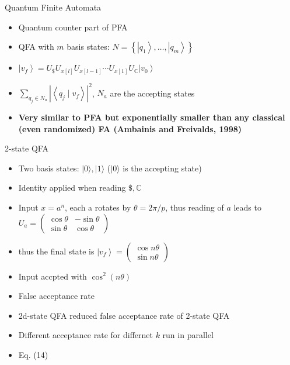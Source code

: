 \documentclass[aspectratio=169,9pt]{beamer}
\begin{document}
\begin{frame}[t]{Quantum Finite Automata}
  \begin{itemize}
    \item Quantum counter part of PFA
    \item QFA with $m$ basis states: $N=\left\{\left|q_{1}\right\rangle, \ldots,\left|q_{m}\right\rangle\right\}$
    \item $\left|v_{f}\right\rangle=U_{\$} U_{x[l]} U_{x[l-1]} \cdots U_{x[1]} U_{\mathbb{C}}\left|v_{0}\right\rangle$
    \item $\sum_{q_{j} \in N_{a}}\left|\left\langle q_{j} \mid v_{f}\right\rangle\right|^{2}$, $N_a$ are the accepting states
    \item \textbf{Very similar to PFA but exponentially smaller than any classical (even randomized) FA (Ambainis and Freivalds, 1998)}
  \end{itemize}
\end{frame}


\begin{frame}[t]{2-state QFA}
  \begin{itemize}
    \item Two basis states: $|0\rangle,|1\rangle$ ($|0\rangle$ is the accepting state)
    \item Identity applied when reading $\$,\mathbb{C}$ 
    \item Input $x=a^n$, each a rotates by $\theta=2\pi/p$, thus reading of $a$
    leads to $U_{a}=\left(\begin{array}{rr}\cos \theta & -\sin \theta \\ \sin \theta & \cos \theta\end{array}\right)$
    \item thus the final state is $\left|v_{f}\right\rangle=\left(\begin{array}{c}\cos n \theta \\ \sin n \theta\end{array}\right)$
    \item Input accpted with $\cos^2(n\theta)$
    \item False acceptance rate
    \item 2d-state QFA reduced false acceptance rate of 2-state QFA
    \item Different acceptance rate for differnet $k$ run in parallel
    \item Eq. (14)
  \end{itemize}
\end{frame}
\end{document}
